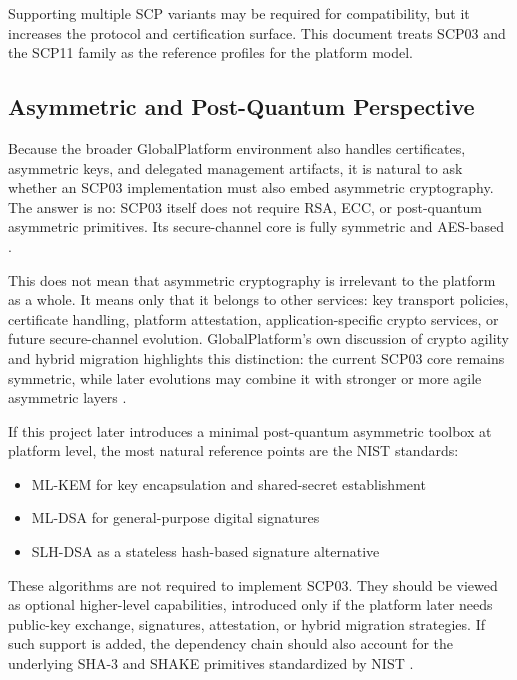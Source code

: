 Supporting multiple SCP variants may be required for compatibility, but it
increases the protocol and certification surface. This document treats SCP03
and the SCP11 family as the reference profiles for the platform model.

\subsection{Asymmetric and Post-Quantum Perspective}

Because the broader GlobalPlatform environment also handles certificates,
asymmetric keys, and delegated management artifacts, it is natural to ask
whether an SCP03 implementation must also embed asymmetric cryptography. The
answer is no: SCP03 itself does not require RSA, ECC, or post-quantum
asymmetric primitives. Its secure-channel core is fully symmetric and AES-based
.

This does not mean that asymmetric cryptography is irrelevant to the platform
as a whole. It means only that it belongs to other services: key transport
policies, certificate handling, platform attestation, application-specific
crypto services, or future secure-channel evolution. GlobalPlatform's own
discussion of crypto agility and hybrid migration highlights this distinction:
the current SCP03 core remains symmetric, while later evolutions may combine it
with stronger or more agile asymmetric layers \cite{gp-hybrid-crypto}.

If this project later introduces a minimal post-quantum asymmetric toolbox at
platform level, the most natural reference points are the NIST standards:
\begin{itemize}
\item ML-KEM for key encapsulation and shared-secret establishment
      \cite{fips203}
\item ML-DSA for general-purpose digital signatures \cite{fips204}
\item SLH-DSA as a stateless hash-based signature alternative \cite{fips205}
\end{itemize}

These algorithms are not required to implement SCP03. They should be viewed as
optional higher-level capabilities, introduced only if the platform later needs
public-key exchange, signatures, attestation, or hybrid migration strategies.
If such support is added, the dependency chain should also account for the
underlying SHA-3 and SHAKE primitives standardized by NIST \cite{fips202}.

